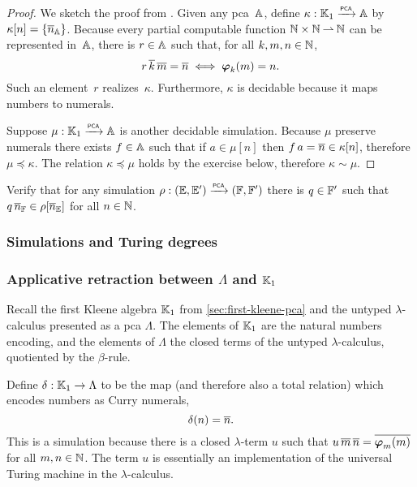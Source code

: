 \begin{proof}
  We sketch the proof from \cite[Theorem 2.4.18]{Longley:94}. Given any pca~$\AA$, define $\kappa : \klone \pcato \AA$ by $\kappa[n] = \set{\numeral{n}_{\AA}}$. Because every partial computable function $\NN \times \NN \parto \NN$ can be represented in~$\AA$, there is $r \in \AA$ such that, for all $k, m, n \in \NN$,
  \begin{equation*}
    r \, \numeral{k} \, \numeral{m} = \numeral{n} \iff \pr{k}{m} = n.
  \end{equation*}
  Such an element~$r$ realizes~$\kappa$. Furthermore, $\kappa$ is decidable because it maps numbers to numerals.

  Suppose $\mu : \klone \pcato \AA$ is another decidable simulation. Because $\mu$ preserve numerals there exists $f \in \AA$ such that if $a \in \mu[n]$ then $f \, a = \numeral{n} \in \kappa[n]$, therefore $\mu \preceq \kappa$. The relation $\kappa \preceq \mu$ holds by the exercise below, therefore $\kappa \sim \mu$.
\end{proof}

\begin{exercise}
  Verify that for any simulation $\rho : (\EE, \subEE) \pcato (\FF, \subFF)$ there is $q \in \subFF$ such that $q \, \overline{n}_{\FF} \in \rho[\overline{n}_{\EE}]$ for all $n \in \NN$.
\end{exercise}

\subsubsection{Simulations and Turing degrees}
\label{ex:pcamorphism-turing-degrees}%


\subsubsection{Applicative retraction between $\Lambda$ and $\klone$}
\label{ex:pcamorphism-K1-lambda}%

Recall the first Kleene algebra $\klone$ from \cref{sec:first-kleene-pca} and the untyped $\lambda$-calculus presented as a pca $\Lambda$. The elements of $\klone$ are the natural numbers encoding, and the elements of $\Lambda$ the closed terms of the untyped $\lambda$-calculus, quotiented by the $\beta$-rule.

Define $\delta : \klone \to \Lambda$ to be the map (and therefore also a total relation) which encodes numbers as Curry numerals,
%
\begin{equation*}
  \delta(n) = \numeral{n}.
\end{equation*}
%
This is a simulation because there is a closed $\lambda$-term $u$ such that $u \, \overline{m} \, \overline{n} = \overline{\pr{m}{m}}$ for all $m, n \in \NN$. The term $u$ is essentially an implementation of the universal Turing machine in the $\lambda$-calculus.

